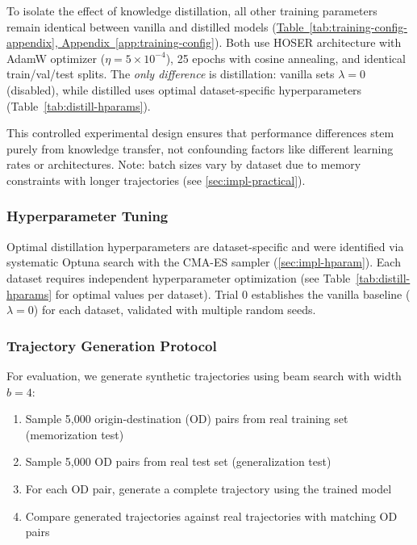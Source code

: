 To isolate the effect of knowledge distillation, all other training parameters remain identical between vanilla and distilled models (\hyperref[app:training-config]{Table~\ref*{tab:training-config-appendix}, Appendix~\ref*{app:training-config}}). Both use HOSER architecture with AdamW optimizer ($\eta = 5 \times 10^{-4}$), 25 epochs with cosine annealing, and identical train/val/test splits. The \emph{only difference} is distillation: vanilla sets $\lambda = 0$ (disabled), while distilled uses optimal dataset-specific hyperparameters (Table~\ref{tab:distill-hparams}).

This controlled experimental design ensures that performance differences stem purely from knowledge transfer, not confounding factors like different learning rates or architectures. Note: batch sizes vary by dataset due to memory constraints with longer trajectories (see \autoref{sec:impl-practical}).

\subsubsection{Hyperparameter Tuning}

Optimal distillation hyperparameters are dataset-specific and were identified via systematic Optuna search with the CMA-ES sampler (\autoref{sec:impl-hparam}). Each dataset requires independent hyperparameter optimization (see Table~\ref{tab:distill-hparams} for optimal values per dataset). Trial 0 establishes the vanilla baseline ($\lambda = 0$) for each dataset, validated with multiple random seeds.

\subsubsection{Trajectory Generation Protocol}

For evaluation, we generate synthetic trajectories using beam search with width $b = 4$:

\begin{enumerate}[noitemsep,topsep=0pt]
    \item Sample 5,000 origin-destination (OD) pairs from real training set (memorization test)
    \item Sample 5,000 OD pairs from real test set (generalization test)
    \item For each OD pair, generate a complete trajectory using the trained model
    \item Compare generated trajectories against real trajectories with matching OD pairs
\end{enumerate}

